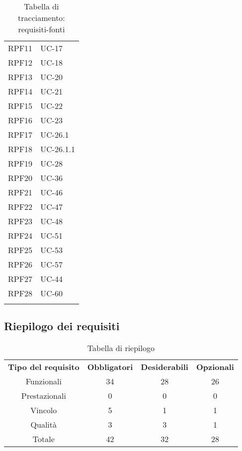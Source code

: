 \begin{longtable}{| p{5cm} | p{5cm} |}
		\rowcolor{LightGray}
		RPF11 & UC-17\\
		RPF12 & UC-18\\
		\rowcolor{LightGray}
		RPF13 & UC-20\\
		RPF14 & UC-21\\
		\rowcolor{LightGray}
		RPF15 & UC-22\\
		RPF16 & UC-23\\
		\rowcolor{LightGray}
		RPF17 & UC-26.1\\
		RPF18 & UC-26.1.1\\
		\rowcolor{LightGray}
		RPF19 & UC-28\\
		RPF20 & UC-36\\
		\rowcolor{LightGray}
		RPF21 & UC-46\\
		RPF22 & UC-47\\
		\rowcolor{LightGray}
		RPF23 & UC-48\\
		RPF24 & UC-51\\
		\rowcolor{LightGray}
		RPF25 & UC-53\\
		RPF26 & UC-57\\	
		\rowcolor{LightGray}
		RPF27 & UC-44\\
		RPF28 & UC-60\\
		\rowcolor{LightGray}
		\hline
		\caption{Tabella di tracciamento: requisiti-fonti}
\end{longtable}

\subsection{Riepilogo dei requisiti}
\begin{table}[h]
\centering
\begin{tabular}{| c | c | c | c |}
		\rowcolor{LightBlue}
		\color{white}\bfseries Tipo del requisito & \color{white}\bfseries Obbligatori & \color{white}\bfseries Desiderabili & \color{white}\bfseries Opzionali \\[0.25cm]
		 Funzionali & 34 & 28 & 26 \\
		 Prestazionali & 0 & 0 & 0 \\
		 Vincolo & 5 & 1 & 1 \\
		 Qualità & 3 & 3 & 1 \\
		 Totale & 42 & 32 & 28 \\ \hline
\end{tabular}
		\caption{Tabella di riepilogo}
\end{table}


\newpage
